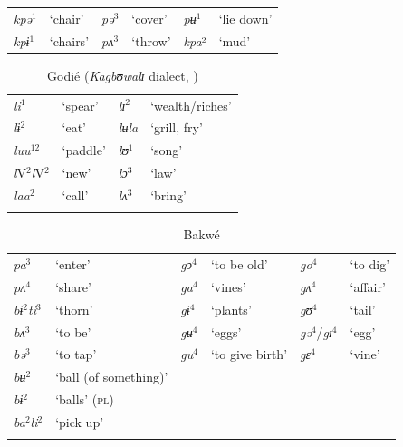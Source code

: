 \documentclass[output=paper,newtxmath,modfonts,nonflat]{langsci/langscibook}
\begin{document}
\ea {} \citep{Werle1976}

\begin{tabular}{llllll}
\textit{kpə}$^1$ & ‘chair’  &  \textit{pə}$^3$ &  ‘cover’  &  \textit{pʉ}$^1$& ‘lie down’\\

\textit{kpɨ}$^1$ &  ‘chairs’ & \textit{pʌ}$^3$   & ‘throw’ & \textit{kpa}²  &  ‘mud’ \\
\end{tabular}\label{ex:zogbo:2}
\z

\begin{table}
\begin{tabularx}{\textwidth}{XXXl}
\lsptoprule	
\textit{li}$^1$  &  ‘spear’  &  \textit{lɪ}$^2$ & ‘wealth/riches’\\

\textit{lɨ}$^2$  &  ‘eat’  &  \textit{lʉla}  &  ‘grill, fry’\\

\textit{luu}$^{12}$ &   ‘paddle’ & \textit{lʊ}$^1$ & ‘song’\\

\textit{l}V$^2$\textit{l}V$^2$ & ‘new’    & \textit{lɔ}$^3$  &  ‘law’ \\

\textit{laa}$^2$ & ‘call’ &   \textit{lʌ}$^3$ &    ‘bring’ \\
\lspbottomrule
\end{tabularx}
\caption{Godié (\textit{Kagbʊwalɪ} dialect, \citealt{Association2004})}
\label{tab:zogbo:6}
\end{table}

\begin{table}
\caption{Bakwé \citep{centredetraduction2006}}
\label{tab:zogbo:7}
\begin{tabularx}{\textwidth}{XlXlXl}
\lsptoprule
\textit{pa}$^3$ &   ‘enter’  &  \textit{gɔ}$^4$    & ‘to be old’ &  \textit{go}$^4$ &    ‘to dig’\\

\textit{pʌ}$^4$  &   ‘share’    & \textit{ga}$^4$ &   ‘vines’     & \textit{gʌ}$^4$ &    ‘affair’\\

\textit{bɨ}$^2$\textit{ti}$^3$ & ‘thorn’ &    \textit{gɨ}$^4$ &   ‘plants’  & \textit{gʊ}$^4$ &    ‘tail’\\

\textit{bʌ}$^3$ & ‘to be’ &    \textit{gʉ}$^4$ &   ‘eggs’  &   \textit{gə}$^4$/\textit{gɪ}$^4$ & ‘egg’\\

\textit{bə}$^3$ & ‘to tap’ &    \textit{gu}$^4$   & ‘to give birth’ &  \textit{gɛ}$^4$  &   ‘vine’\\

\textit{bʉ}$^2$ & ‘ball (of something)’\\

\textit{bɨ}$^2$ & ‘balls’ (\textsc{pl})\\

\textit{ba}$^2$\textit{li}$^2$ & ‘pick up’\\
\lspbottomrule
\end{tabularx}
\end{table}
\end{document}
